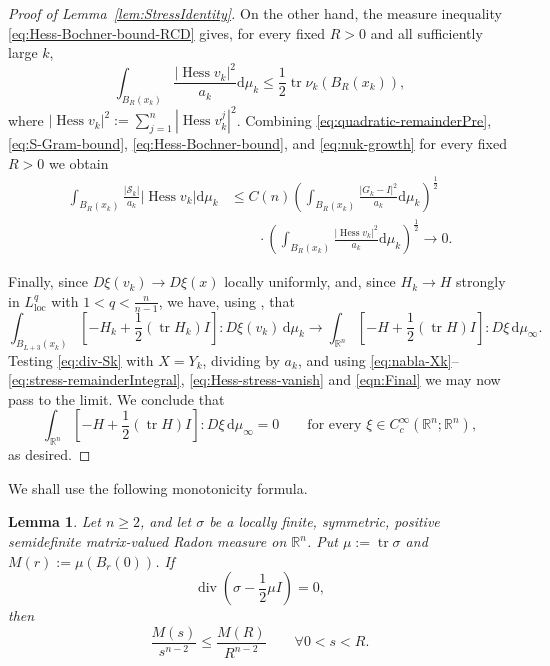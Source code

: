 \documentclass[12pt,a4paper,reqno]{amsart}
\newtheorem{lemma}[theorem]{Lemma}
\renewcommand{\leq}{\leqslant}
\renewcommand{\geq}{\geqslant}
\newcommand{\Hess}{\operatorname{Hess}}
\begin{document}
\begin{proof}[Proof of Lemma~\ref{lem:StressIdentity}]
On the other hand, the measure inequality
\eqref{eq:Hess-Bochner-bound-RCD} gives, for every fixed $R>0$ and all
sufficiently large $k$,
\begin{equation}
 \int_{B_R(x_k)}\frac{|\operatorname{Hess}v_k|^2}{a_k}\mathrm{d}\mu_k
 \leq\frac12\operatorname{tr}\nu_k(B_R(x_k)),
 \label{eq:Hess-Bochner-bound}
\end{equation}
where $|\Hess v_k|^2:=\sum_{j=1}^n |\Hess v_k^j|^2$.
Combining \eqref{eq:quadratic-remainderPre}, \eqref{eq:S-Gram-bound},
\eqref{eq:Hess-Bochner-bound}, and \eqref{eq:nuk-growth} for every fixed $R>0$ we obtain
\begin{equation}
 \begin{split}
 \int_{B_R(x_k)}\frac{|\mathcal S_k|}{a_k}
       |\operatorname{Hess}v_k|\mathrm{d}\mu_k
 &\leq C(n)
 \left(\int_{B_R(x_k)}\frac{|G_k-I|^2}{a_k}\mathrm{d}\mu_k\right)^{\frac{1}{2}}\\
 &\phantom{++}\cdot \left(\int_{B_R(x_k)}\frac{|\operatorname{Hess}v_k|^2}{a_k}\mathrm{d}\mu_k\right)^{\frac{1}{2}}
 \to 0.
 \end{split}
 \label{eq:Hess-stress-vanish}
\end{equation}

Finally, since
$D\xi(v_k)\to D\xi(x)$ locally uniformly, and, since $H_k\to H$ strongly in
$L^q_{\mathrm{loc}}$ with $1<q<\frac{n}{n-1}$, we have, using \cite[Proposition 3.27]{HondaLp}, that
\begin{equation}\label{eqn:Final}
\int_{B_{L+3}(x_k)}
 \left[-H_k+\frac12(\operatorname{tr}H_k)I\right]:D\xi(v_k)
 \,\mathrm{d}\mu_k\to  \int_{\mathbb R^n}
 \left[-H+\frac12(\operatorname{tr}H)I\right]:D\xi
 \,\mathrm{d}\mu_\infty.
\end{equation}
Testing \eqref{eq:div-Sk} with $X=Y_k$, dividing by $a_k$, and using
\eqref{eq:nabla-Xk}--\eqref{eq:stress-remainderIntegral}, \eqref{eq:Hess-stress-vanish} and \eqref{eqn:Final} we may now pass to the limit.
We conclude that
\[
 \int_{\mathbb R^n}
 \left[-H+\frac12(\operatorname{tr}H)I\right]:D\xi
 \,\mathrm{d}\mu_\infty=0
 \qquad
 \text{for every }\xi\in C_c^\infty(\mathbb R^n;\mathbb R^n),
\]
as desired.
\end{proof}

We shall use the following monotonicity formula.

\begin{lemma}\label{lem:Monotonicity}
Let $n\geq2$, and let $\sigma$ be a locally finite, symmetric,
positive semidefinite matrix-valued Radon measure on $\mathbb R^n$. Put
$\mu:=\operatorname{tr}\sigma$ and $M(r):=\mu(B_r(0))$. If
\begin{equation}
 \operatorname{div}\left(\sigma-\frac12\mu I\right)=0,
 \label{eq:stationary-assumption}
\end{equation}
then
\begin{equation}
 \frac{M(s)}{s^{n-2}}\leq\frac{M(R)}{R^{n-2}}
 \qquad \forall 0<s<R.
 \label{eq:stationary-monotonicity}
\end{equation}
\end{lemma}
\end{document}
